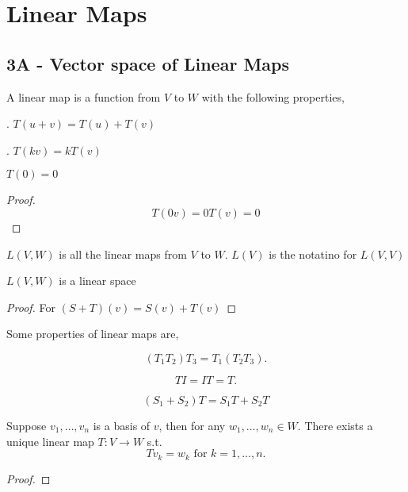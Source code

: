 \setcounter{chapter}{2}
\chapter{Linear Maps}
\section*{3A - Vector space of Linear Maps}

\begin{definition}
    A linear map is a function from $V$ to $W$ with the following properties,

        . $T(u + v) = T(u) + T(v)$

        . $T(kv) = k T(v)$

\end{definition}


\begin{lemma}
    $T(0) = 0$
\end{lemma}

\begin{proof}
    $$T(0v) = 0 T(v) = 0$$
\end{proof}


$L(V,W) $ is all the linear maps from  $V$ to $W$. $L(V) $ is the notatino for  $L(V,V)$



\begin{theorem}
    $L(V,W)$ is a linear space
\end{theorem}
\begin{proof}
     For $(S+T)(v) = S(v) + T(v)$
\end{proof}



Some properties of linear maps are, 


\begin{property}
    \[
        (T_1T_2)T_3 = T_1(T_2T_3)
    .\] 
\end{property}
\begin{property}
    \[
    TI = IT = T
    .\]  
\end{property}          
\begin{property}
    $$(S_1+S_2)T = S_1T + S_2T $$
\end{property}

\begin{lemma}
    Suppose $v_1,\dots,v_n$ is a basis of $v$, then for any $w_1,\dots,w_n \in W$. There exists a unique linear map $T: V \rightarrow W$ s.t. \[
        Tv_k = w_k \text { for $k = 1,\dots,n$}
    .\] 
\end{lemma}
\begin{proof}
        
\end{proof}

